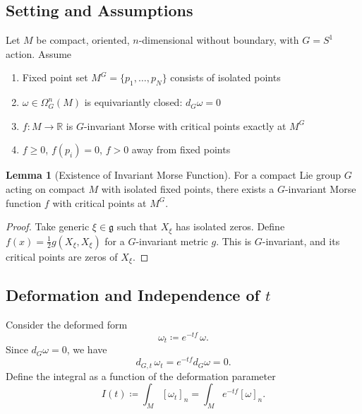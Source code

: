 \documentclass[10pt]{article}
\theoremstyle{definition}
\newtheorem{lemma}[definition]{Lemma}
\newcommand{\R}{\mathbb{R}}
\newcommand{\sone}{S^{1}}
\begin{document}
\subsection{Setting and Assumptions}\label{subsec:setting}
Let $M$ be compact, oriented, $n$-dimensional without boundary, with $G = \sone$ action. Assume
\begin{enumerate}
    \item Fixed point set $M^G = \{p_1, \dots, p_N\}$ consists of isolated points
    \item $\omega \in \Omega^{n}_{G}(M)$ is equivariantly closed: $d_G \omega = 0$
    \item $f: M \to \R$ is $G$-invariant Morse with critical points exactly at $M^G$
    \item $f \geq 0$, $f(p_i) = 0$, $f > 0$ away from fixed points
\end{enumerate}

\begin{lemma}[Existence of Invariant Morse Function]
For a compact Lie group $G$ acting on compact $M$ with isolated fixed points, there exists a $G$-invariant Morse function $f$ with critical points at $M^G$.
\end{lemma}
\begin{proof}
Take generic $\xi \in \mathfrak{g}$ such that $X_\xi$ has isolated zeros. Define $f(x) = \frac{1}{2} g(X_\xi, X_\xi)$ for a $G$-invariant metric $g$. This is $G$-invariant, and its critical points are zeros of $X_\xi$.
\end{proof}

\subsection{Deformation and Independence of $t$}\label{subsec:independence}
Consider the deformed form
\begin{equation}\label{eq:deformed-form}
    \omega_{t} \coloneqq e^{-tf} \, \omega .
\end{equation}
Since $d_G \omega = 0$, we have
\begin{equation}
    d_{G,t} \, \omega_t = e^{-tf} d_G \omega = 0.
\end{equation}
Define the integral as a function of the deformation parameter
\begin{equation}\label{eq:integral-t}
    I(t) \coloneqq \int_{M} [\omega_t]_n = \int_{M} e^{-tf} [\omega]_n.
\end{equation}
\end{document}
